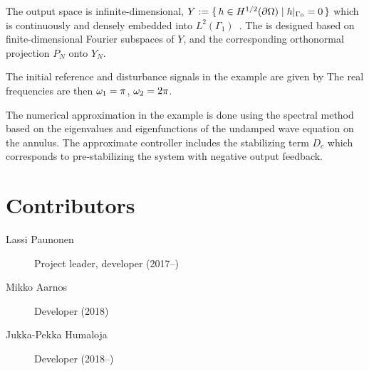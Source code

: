 \documentclass[11pt, a4paper]{amsart}
\theoremstyle{definition}
\numberwithin{equation}{section}
\begin{document}
{  The output space is infinite-dimensional,  $Y :=  \{\,h\in H^{1/2}(\partial\Omega)\mid h\vert_{\Gamma_0}=0\,\}$ which is continuously and densely embedded into $L^2(\Gamma_1)$~. 
  The  is designed based on finite-dimensional Fourier subspaces
  of $Y$, and the corresponding orthonormal projection $P_N$ onto $Y_N$.

  The initial reference and disturbance signals in the example are given by
  The real frequencies are then $\omega_1=\pi$, $ \omega_2=2\pi$.

  The numerical approximation in the example is done using the spectral method based on the eigenvalues and eigenfunctions of the undamped wave equation on the annulus. The approximate controller includes the stabilizing term $D_c$ which corresponds to pre-stabilizing the system with negative output feedback. 
}

\section{Contributors}


\begin{description}
  \item[Lassi Paunonen] Project leader, developer (2017--)
  \item[Mikko Aarnos] Developer (2018)
  \item[Jukka-Pekka Humaloja] Developer (2018--)
\end{description}
\end{document}
